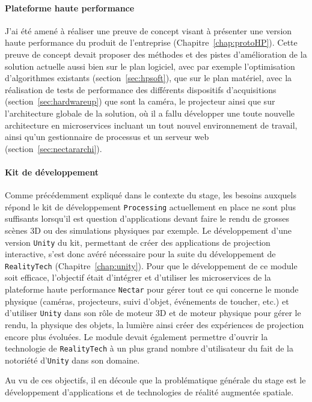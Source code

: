 \paragraph{Plateforme haute performance} J'ai été amené à réaliser une preuve de concept visant à présenter une version haute performance du produit de l'entreprise (Chapitre~\ref{chap:protoHP}). Cette preuve de concept devait proposer des méthodes et des pistes d'amélioration de la solution actuelle aussi bien sur le plan logiciel, avec par exemple l'optimisation d'algorithmes existants (section~\ref{sec:hpsoft}), que sur le plan matériel, avec la réalisation de tests de performance des différents dispositifs d'acquisitions (section~\ref{sec:hardwareup}) que sont la caméra, le projecteur ainsi que sur l'architecture globale de la solution, où il a fallu développer une toute nouvelle architecture en microservices incluant un tout nouvel environnement de travail, ainsi qu'un gestionnaire de processus et un serveur web (section~\ref{sec:nectararchi}).

\paragraph{Kit de développement} Comme précédemment expliqué dans le contexte du stage, les besoins auxquels répond le kit de développement \texttt{Processing} actuellement en place ne sont plus suffisants lorsqu'il est question d'applications devant faire le rendu de grosses scènes 3D ou des simulations physiques par exemple. Le développement d'une version \texttt{Unity} du kit, permettant de créer des applications de projection interactive, s'est donc avéré nécessaire pour la suite du développement de \texttt{RealityTech} (Chapitre~\ref{chap:unity}). Pour que le développement de ce module soit efficace, l'objectif était d'intégrer et d'utiliser les microservices de la plateforme haute performance \texttt{Nectar} pour gérer tout ce qui concerne le monde physique (caméras, projecteurs, suivi d'objet, événements de toucher, etc.) et d'utiliser \texttt{Unity} dans son rôle de moteur 3D et de moteur physique pour gérer le rendu, la physique des objets, la lumière ainsi créer des expériences de projection encore plus évoluées. Le module devait également permettre d'ouvrir la technologie de \texttt{RealityTech} à un plus grand nombre d'utilisateur du fait de la notoriété d'\texttt{Unity} dans son domaine.\\

\begin{center}
Au vu de ces objectifs, il en découle que la problématique générale du stage est le développement d'applications et de technologies de réalité augmentée spatiale.
\end{center}

